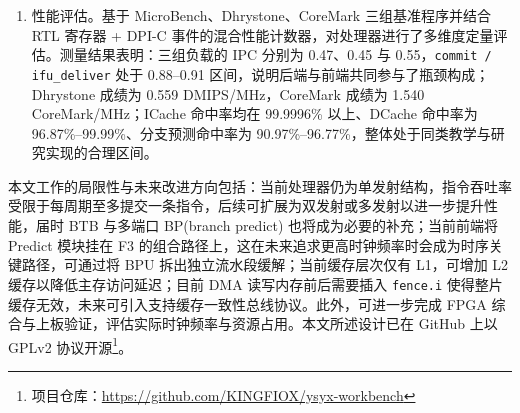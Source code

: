 \begin{conclusions}
\begin{enumerate}
  \item 性能评估。基于 MicroBench、Dhrystone、CoreMark 三组基准程序并结合 RTL 寄存器 + DPI-C 事件的混合性能计数器，对处理器进行了多维度定量评估。测量结果表明：三组负载的 IPC 分别为 0.47、0.45 与 0.55，\lstinline|commit / ifu_deliver| 处于 0.88--0.91 区间，说明后端与前端共同参与了瓶颈构成；Dhrystone 成绩为 0.559 DMIPS/MHz，CoreMark 成绩为 1.540 CoreMark/MHz；ICache 命中率均在 99.9996\% 以上、DCache 命中率为 96.87\%--99.99\%、分支预测命中率为 90.97\%--96.77\%，整体处于同类教学与研究实现的合理区间。
\end{enumerate}

本文工作的局限性与未来改进方向包括：当前处理器仍为单发射结构，指令吞吐率受限于每周期至多提交一条指令，后续可扩展为双发射或多发射以进一步提升性能，届时 BTB 与多端口 BP(branch predict) 也将成为必要的补充；当前前端将 Predict 模块挂在 F3 的组合路径上，这在未来追求更高时钟频率时会成为时序关键路径，可通过将 BPU 拆出独立流水段缓解；当前缓存层次仅有 L1，可增加 L2 缓存以降低主存访问延迟；目前 DMA 读写内存前后需要插入 \lstinline|fence.i| 使得整片缓存无效，未来可引入支持缓存一致性总线协议。此外，可进一步完成 FPGA 综合与上板验证，评估实际时钟频率与资源占用。本文所述设计已在 GitHub 上以 GPLv2 协议开源\footnote{项目仓库：\url{https://github.com/KINGFIOX/ysyx-workbench}}。

\end{conclusions}
